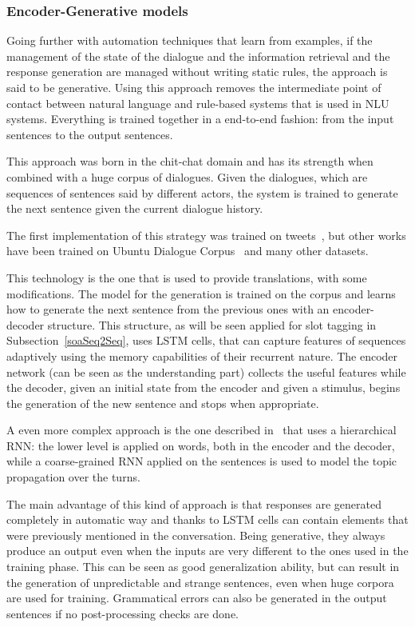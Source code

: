 \subsubsection{Encoder-Generative models}
\label{soaGenerativeApproach}

Going further with automation techniques that learn from examples, if the management of the state of the dialogue and the information retrieval and the response generation are managed without writing static rules, the approach is said to be generative. Using this approach removes the intermediate point of contact between natural language and rule-based systems that is used in NLU systems. Everything is trained together in a end-to-end fashion: from the input sentences to the output sentences.

This approach was born in the chit-chat domain and has its strength when combined with a huge corpus of dialogues. Given the dialogues, which are sequences of sentences said by different actors, the system is trained to generate the next sentence given the current dialogue history.

The first implementation of this strategy was trained on tweets~\cite{ritter2011data}, but other works have been trained on Ubuntu Dialogue Corpus~\cite{lowe2015ubuntu} and many other datasets.

This technology is the one that is used to provide translations, with some modifications. The model for the generation is trained on the corpus and learns how to generate the next sentence from the previous ones with an encoder-decoder structure. This structure, as will be seen applied for slot tagging in Subsection~\ref{soaSeq2Seq}, uses LSTM cells, that can capture features of sequences adaptively using the memory capabilities of their recurrent nature. The encoder network (can be seen as the understanding part) collects the useful features while the decoder, given an initial state from the encoder and given a stimulus, begins the generation of the new sentence and stops when appropriate.

A even more complex approach is the one described in~\cite{serban2016building} that uses a hierarchical RNN: the lower level is applied on words, both in the encoder and the decoder, while a coarse-grained RNN applied on the sentences is used to model the topic propagation over the turns.

The main advantage of this kind of approach is that responses are generated completely in automatic way and thanks to LSTM cells can contain elements that were previously mentioned in the conversation. Being generative, they always produce an output even when the inputs are very different to the ones used in the training phase. This can be seen as good generalization ability, but can result in the generation of unpredictable and strange sentences, even when huge corpora are used for training. Grammatical errors can also be generated in the output sentences if no post-processing checks are done.

